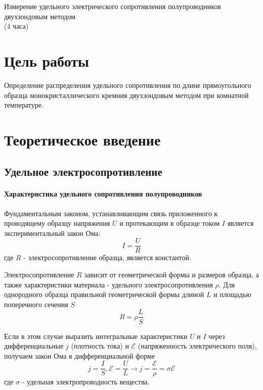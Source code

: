 \newpage

\setcounter{chapter}{1}

\begin{center}
Измерение удельного электрического сопротивления полупроводников двухзондовым методом\\
(4 часа)
\end{center}

\section{Цель работы}
Определение распределения удельного сопротивления по длине прямоугольного образца монокристаллического кремния двухзондовым методом при комнатной температуре.

\section{Теоретическое введение}
\subsection{Удельное электросопротивление}
\paragraph{Характеристика удельного сопротивления полупроводников}

Фундаментальным законом, устанавливающим связь приложенного к проводящему образцу напряжения $U$ и протекающим в образце током $I$ является экспериментальный закон Ома:
\begin{equation}
I = \frac{U}{R}
\end{equation}
где $R$ - электросопротивление образца, является константой.

Электросопротивление $R$ зависит от геометрической формы и размеров образца, а также характеристики материала - удельного электросопротивления $\rho$. Для однородного образца правильной геометрической формы длиной $L$ и площадью поперечного сечения $S$
\begin{equation}
R = \rho \frac{L}{S}
\end{equation}

Если в этом случае выразить интегральные характеристики $U$ и $I$ через дифференциальные $j$ (плотность тока) и $\mathcal{E}$ (напряженность электрического поля), получаем закон Ома в дифференциальной форме
\begin{equation}
j = \frac{I}{S}, \mathcal{E} = \frac{U}{L} \rightarrow j = \frac{\mathcal{E}}{\rho} = \sigma \mathcal{E}
\end{equation}
где $\sigma$ - удельная электропроводность вещества.

